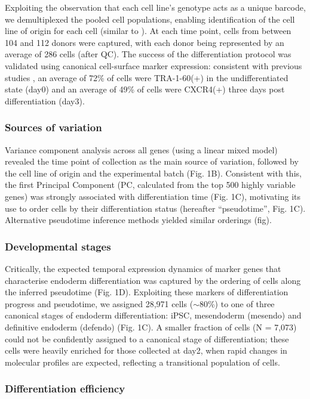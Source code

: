  Exploiting the observation that each cell line’s genotype acts as a unique barcode, we demultiplexed the pooled cell populations, enabling identification of the cell line of origin for each cell (similar to \cite{kang2018multiplexed}). 
 At each time point, cells from between 104 and 112 donors were captured, with each donor being represented by an average of 286 cells (after QC). 
 The success of the differentiation protocol was validated using canonical cell-surface marker expression: consistent with previous studies \cite{chu2016single}, an average of 72\% of cells were TRA-1-60(+) in the undifferentiated state (day0) and an average of 49\% of cells were CXCR4(+) three days post differentiation (day3).

\subsubsection{Sources of variation} 

Variance component analysis across all genes (using a linear mixed model) revealed the time point of collection as the main source of variation, followed by the cell line of origin and the experimental batch (Fig. 1B). 
Consistent with this, the first Principal Component (PC, calculated from the top 500 highly variable genes) was strongly associated with differentiation time (Fig. 1C), motivating its use to order cells by their differentiation status (hereafter “pseudotime”, Fig. 1C).
Alternative pseudotime inference methods yielded similar orderings (fig).

\subsubsection{Developmental stages}
 
Critically, the expected temporal expression dynamics of marker genes that characterise endoderm differentiation was captured by the ordering of cells along the inferred pseudotime (Fig. 1D). 
Exploiting these markers of differentiation progress and pseudotime, we assigned 28,971 cells ($\sim$80\%) to one of three canonical stages of endoderm differentiation: iPSC, mesendoderm (mesendo) and definitive endoderm (defendo) (Fig. 1C). 
A smaller fraction of cells (N = 7,073) could not be confidently assigned to a canonical stage of differentiation; these cells were heavily enriched for those collected at day2, when rapid changes in molecular profiles are expected, reflecting a transitional population of cells.

\subsubsection{Differentiation efficiency}

